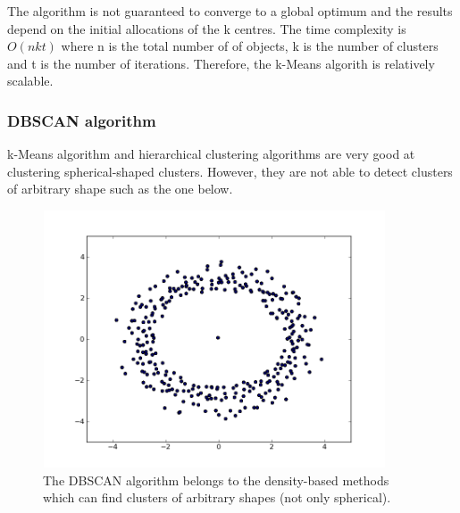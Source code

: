The algorithm is not guaranteed to converge to a global optimum and the results depend on the initial allocations of the k centres. The time complexity is $O(nkt)$ where n is the total number of of objects, k is the number of clusters and t is the number of iterations. Therefore, the k-Means algorith is relatively scalable. 

\subsubsection{DBSCAN algorithm}
k-Means algorithm and hierarchical clustering algorithms are very good at clustering spherical-shaped clusters. However, they are not able to detect clusters of arbitrary shape such as the one below.  \

\begin{figure}[!htbp]
  \begin{center}
    \includegraphics[height=3in, width=4in]{dbscan-example}
    \caption{The DBSCAN algorithm belongs to the density-based methods which can find clusters of arbitrary shapes (not only spherical).}
    \label{DBSCANExample}
  \end{center}
\end{figure} 

